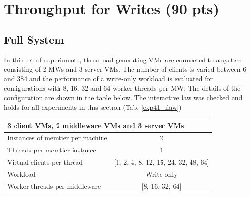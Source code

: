 \documentclass[report.tex]{subfiles}
\begin{document}
\section{Throughput for Writes (90 pts)}\label{exp4}

\subsection{Full System}

In this set of experiments, three load generating VMs are connected to a system  consisting of 2 MWs and 3 server VMs.
The number of clients is varied between 6 and 384 and the performance of a write-only workload is evaluated for configurations with 8, 16, 32 and 64 worker-threads per MW. The details of the configuration are shown in the table below.
The interactive law was checked and holds for all experiments in this section (Tab. \ref{exp41_ilaw})

\begin{center}
	\scriptsize{
		\begin{tabular}{|l|c|}
			\multicolumn{2}{l}{3 client VMs, 2 middleware VMs and 3 server VMs}\\
			\hline Instances of memtier per machine & 2          \\ 
			\hline Threads per memtier instance     & 1          \\
			\hline Virtual clients per thread       & [1, 2, 4, 8, 12, 16, 24, 32, 48, 64]    \\ 
			\hline Workload                         & Write-only \\
			\hline Worker threads per middleware    & [8, 16, 32, 64]    \\
			\hline 
		\end{tabular}
	} 
\end{center}
\end{document}
